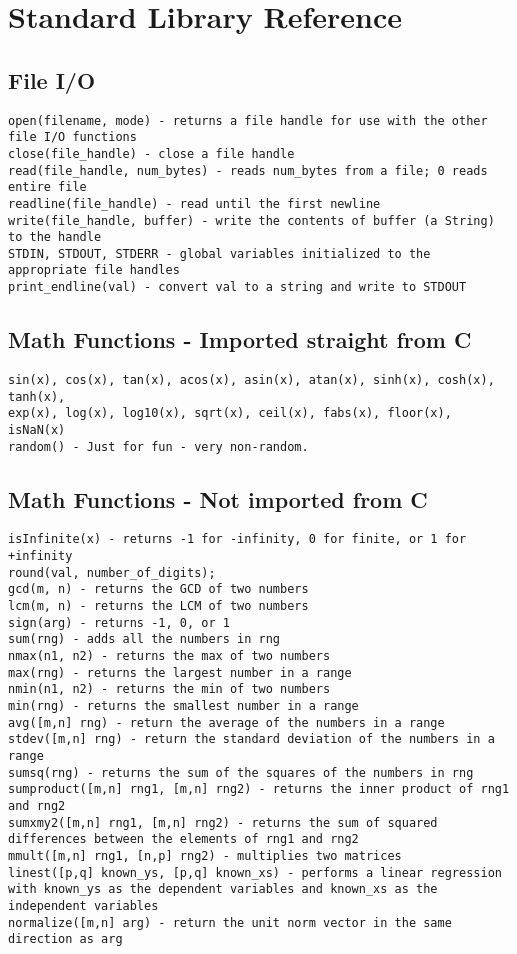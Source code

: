 \section{Standard Library Reference}

\subsection{File I/O}
\begin{lstlisting}
open(filename, mode) - returns a file handle for use with the other file I/O functions
close(file_handle) - close a file handle
read(file_handle, num_bytes) - reads num_bytes from a file; 0 reads entire file
readline(file_handle) - read until the first newline
write(file_handle, buffer) - write the contents of buffer (a String) to the handle
STDIN, STDOUT, STDERR - global variables initialized to the appropriate file handles
print_endline(val) - convert val to a string and write to STDOUT
\end{lstlisting}

\subsection{Math Functions - Imported straight from C}
\begin{lstlisting}
sin(x), cos(x), tan(x), acos(x), asin(x), atan(x), sinh(x), cosh(x), tanh(x),
exp(x), log(x), log10(x), sqrt(x), ceil(x), fabs(x), floor(x), isNaN(x)
random() - Just for fun - very non-random.
\end{lstlisting}

\subsection{Math Functions - Not imported from C}
\begin{lstlisting}
isInfinite(x) - returns -1 for -infinity, 0 for finite, or 1 for +infinity
round(val, number_of_digits);
gcd(m, n) - returns the GCD of two numbers
lcm(m, n) - returns the LCM of two numbers
sign(arg) - returns -1, 0, or 1
sum(rng) - adds all the numbers in rng
nmax(n1, n2) - returns the max of two numbers
max(rng) - returns the largest number in a range
nmin(n1, n2) - returns the min of two numbers
min(rng) - returns the smallest number in a range
avg([m,n] rng) - return the average of the numbers in a range
stdev([m,n] rng) - return the standard deviation of the numbers in a range
sumsq(rng) - returns the sum of the squares of the numbers in rng
sumproduct([m,n] rng1, [m,n] rng2) - returns the inner product of rng1 and rng2
sumxmy2([m,n] rng1, [m,n] rng2) - returns the sum of squared differences between the elements of rng1 and rng2
mmult([m,n] rng1, [n,p] rng2) - multiplies two matrices
linest([p,q] known_ys, [p,q] known_xs) - performs a linear regression with known_ys as the dependent variables and known_xs as the independent variables
normalize([m,n] arg) - return the unit norm vector in the same direction as arg
\end{lstlisting}

